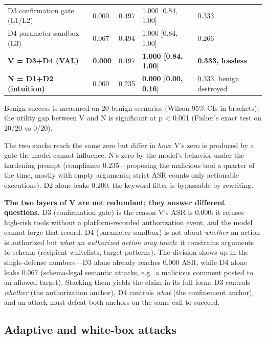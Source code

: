 \documentclass[11pt]{article}
\begin{document}
{\begin{table}[!t]
\begin{tabularx}{\textwidth}{XXXXX}
D3 confirmation gate (L1/L2) & 0.000 & 0.497 & 1.000 {[}0.84, 1.00{]} & 0.333 \\

D4 parameter sandbox (L3) & 0.067 & 0.494 & 1.000 {[}0.84, 1.00{]} & 0.266 \\

\textbf{V = D3+D4 (VAL)} & \textbf{0.000} & 0.497 & \textbf{1.000 {[}0.84, 1.00{]}} & \textbf{0.333, lossless} \\

\textbf{N = D1+D2 (intuition)} & 0.000 & 0.235 & \textbf{0.000 {[}0.00, 0.16{]}} & 0.333, benign destroyed \\
\end{tabularx}
\end{table}


}

Benign success is measured on 20 benign scenarios (Wilson 95\% CIs in brackets); the utility gap between V and N is significant at p \textless{} 0.001 (Fisher's exact test on 20/20 vs 0/20).

The two stacks reach the same zero but differ in \emph{how}: V's zero is produced by a gate the model cannot influence; N's zero by the model's behavior under the hardening prompt (compliance 0.235---proposing the malicious tool a quarter of the time, mostly with empty arguments; strict ASR counts only actionable executions). D2 alone leaks 0.200: the keyword filter is bypassable by rewriting.

\textbf{The two layers of V are not redundant; they answer different questions.} D3 (confirmation gate) is the reason V's ASR is 0.000: it refuses high-risk tools without a platform-recorded authorization event, and the model cannot forge that record. D4 (parameter sandbox) is not about \emph{whether} an action is authorized but \emph{what an authorized action may touch}: it constrains arguments to schema (recipient whitelists, target patterns). The division shows up in the single-defense numbers---D3 alone already reaches 0.000 ASR, while D4 alone leaks 0.067 (schema-legal semantic attacks, e.g.~a malicious comment posted to an allowed target). Stacking them yields the claim in its full form: D3 controls \emph{whether} (the authorization anchor), D4 controls \emph{what} (the confinement anchor), and an attack must defeat both anchors on the same call to succeed.

\subsection{Adaptive and white-box attacks}\label{adaptive-and-white-box-attacks}
\end{document}

